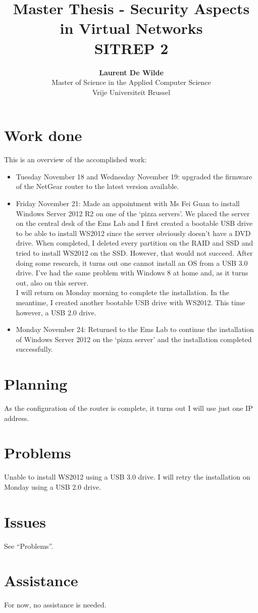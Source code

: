 \documentclass[11pt, a4paper]{article}
\title{Master Thesis -  Security Aspects in Virtual Networks\\ \textbf{SITREP 2}}
\author{\textbf{Laurent De Wilde} \\ Master of Science in the Applied Computer Science \\ Vrije Universiteit Brussel}
\begin{document}
\maketitle

\section{Work done}

This is an overview of the accomplished work:
\begin{itemize}
\item Tuesday November 18 and Wednesday November 19: upgraded the firmware of the NetGear router to the latest version available.
\item Friday November 21: Made an appointment with Ms Fei Guan to install Windows Server 2012 R2 on one of the `pizza servers'. We placed the server on the central desk of the Ems Lab and I first created a bootable USB drive to be able to install WS2012 since the server obviously doesn't have a DVD drive. When completed, I deleted every partition on the RAID and SSD and tried to install WS2012 on the SSD. However, that would not succeed. After doing some research, it turns out one cannot install an OS from a USB 3.0 drive. I've had the same problem with Windows 8 at home and, as it turns out, also on this server.\\
I will return on Monday morning to complete the installation. In the meantime, I created another bootable USB drive with WS2012. This time however, a USB 2.0 drive.
\item Monday November 24: Returned to the Ems Lab to continue the installation of Windows Server 2012 on the `pizza server' and the installation completed successfully.
\end{itemize}

\section{Planning}

As the configuration of the router is complete, it turns out I will use just one IP address.

\section{Problems}

Unable to install WS2012 using a USB 3.0 drive. I will retry the installation on Monday using a USB 2.0 drive.

\section{Issues}

See ``Problems''.

\section{Assistance}

For now, no assistance is needed.
\end{document}
